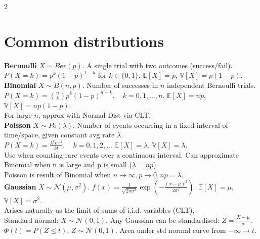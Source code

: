 \documentclass[10pt]{article}
\begin{document}
\small 

\raggedright

\begin{multicols*}{2}

\section*{Common distributions}
\textbf{Bernoulli} $X\sim Ber(p)$. A single trial with two outcomes (success/fail).\\
$P(X=k) = p^k(1-p)^{1-k}$ for $k \in \{0, 1\}$. $\mathbb{E}[X] = p$, $\mathbb{V}[X] = p(1-p)$.\\
\textbf{Binomial} $X\sim B(n, p)$. Number of successes in $n$ independent Bernoulli trials.\\
$P(X=k) = \binom{n}{k} p^k (1-p)^{n-k}, \quad k=0,1,\ldots,n$. $\mathbb{E}[X] = np$, $\mathbb{V}[X] = np(1-p)$.\\
For large $n$, approx with Normal Dist via CLT.\\
\textbf{Poisson} $X \sim Po(\lambda)$. Number of events occurring in a fixed interval of time/space, given constant avg rate $\lambda$.\\
$P(X=k) = \frac{\lambda^k e^{-\lambda}}{k!},\quad k=0,1,2,\ldots$   $\mathbb{E}[X] = \lambda$, $\mathbb{V}[X] = \lambda$.\\
Use when counting rare events over a continuous interval. Can approximate Binomial when n is large and p is small ($\lambda = np$).\\
Poisson is result of Binomial when $n\to\infty, p\to 0, np=\lambda$.\\
\textbf{Gaussian} $X\sim \mathcal{N}(\mu,\sigma^2)$. $f(x) = \frac{1}{\sqrt{2\pi\sigma^2}} \exp\left(-\frac{(x-\mu)^2}{2\sigma^2}\right)$. $\mathbb{E}[X] = \mu$, $\mathbb{V}[X] = \sigma^2$.\\
Arises naturally as the limit of sums of i.i.d. variables (CLT).\\
Standard normal: $X\sim\mathcal{N}(0,1)$. Any Gaussian can be standardised: $Z=\frac{X-\mu}{\sigma}$.\\
$\Phi(t)=P(Z\leq t)$, $Z\sim\mathcal{N}(0,1)$. Area under std normal curve from $-\infty\to t$.


\end{multicols*}
\end{document}
